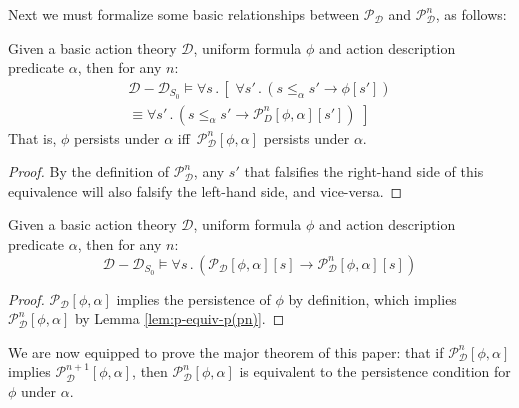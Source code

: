 Next we must formalize some basic relationships between $\mathcal{P}_{\mathcal{D}}$
and $\mathcal{P}_{\mathcal{D}}^{n}$, as follows:

\begin{lemma}
Given a basic action theory $\mathcal{D}$, uniform formula $\phi$
and action description predicate $\alpha$, then for any $n$:\label{lem:p-equiv-p(pn)}\begin{multline*}
\mathcal{D}-\mathcal{D}_{S_{0}}\models\forall s\,.\,\left[\,\,\forall s'\,.\,\left(s\leq_{\alpha}s'\rightarrow\phi[s']\right)\right.\\
\left.\equiv\forall s'\,.\,\left(s\leq_{\alpha}s'\rightarrow\mathcal{P}_{D}^{n}[\phi,\alpha][s']\right)\,\,\right]\end{multline*}
That is, $\phi$ persists under $\alpha$ iff $\,\mathcal{P}_{\mathcal{D}}^{n}[\phi,\alpha]$
persists under $\alpha$.
\end{lemma}
\begin{proof}
By the definition of $\mathcal{P}_{\mathcal{D}}^{n}$, any $s'$ that
falsifies the right-hand side of this equivalence will also falsify
the left-hand side, and vice-versa. 
\end{proof}
\begin{lemma}
Given a basic action theory $\mathcal{D}$, uniform formula $\phi$
and action description predicate $\alpha$, then for any $n$:\label{lem:p-implies-pn}\[
\mathcal{D}-\mathcal{D}_{S_{0}}\models\forall s\,.\,\left(\mathcal{P_{D}}[\phi,\alpha][s]\rightarrow\mathcal{P}_{\mathcal{D}}^{n}[\phi,\alpha][s]\right)\]

\end{lemma}
\begin{proof}
$\mathcal{P_{D}}[\phi,\alpha]$ implies the persistence of $\phi$
by definition, which implies $\mathcal{P}_{\mathcal{D}}^{n}[\phi,\alpha]$
by Lemma \ref{lem:p-equiv-p(pn)}.
\end{proof}
We are now equipped to prove the major theorem of this paper: that
if $\mathcal{P}_{\mathcal{D}}^{n}[\phi,\alpha]$ implies $\mathcal{P}_{\mathcal{D}}^{n+1}[\phi,\alpha]$,
then $\mathcal{P}_{\mathcal{D}}^{n}[\phi,\alpha]$ is equivalent to
the persistence condition for $\phi$ under $\alpha$.

